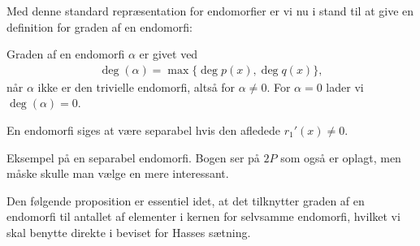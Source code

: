 Med denne standard repræsentation for endomorfier er vi nu i stand til at give en definition for graden af en endomorfi:

\begin{definition}
Graden af en endomorfi $\alpha$ er givet ved
\begin{align*}
	\deg(\alpha) = \max \{ \deg p(x), \deg q(x) \},
\end{align*}
når $\alpha$ ikke er den trivielle endomorfi, altså for $\alpha \neq 0$. For $\alpha = 0$ lader vi $\deg (\alpha) = 0$.
\end{definition}

En endomorfi siges at være separabel hvis den afledede $r_1'(x) \neq 0$.

\begin{example}
Eksempel på en separabel endomorfi. Bogen ser på $2P$ som også er oplagt, men måske skulle man vælge en mere interessant.
\end{example}

Den følgende proposition er essentiel idet, at det tilknytter graden af en endomorfi til antallet af elementer i kernen for selvsamme endomorfi, hvilket vi skal benytte direkte i beviset for Hasses sætning.

